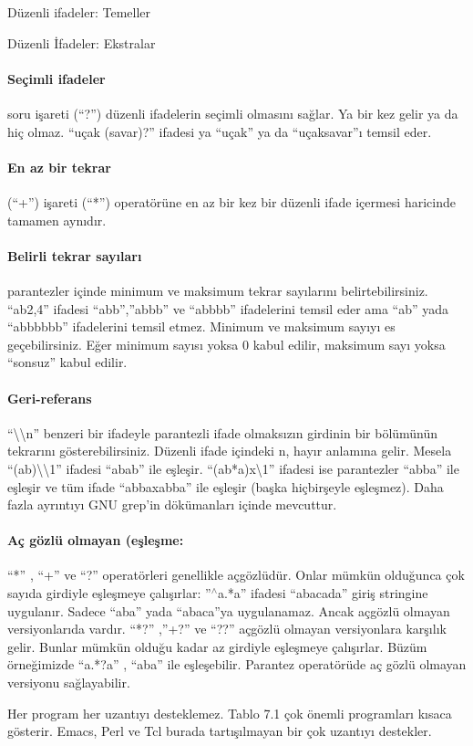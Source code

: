 \documentclass[10pt,a5paper]{book}
\begin{document}
\begin{section}{Düzenli ifadeler: Temeller}
\begin{subsection}{Düzenli İfadeler: Ekstralar}
\paragraph{Seçimli ifadeler} {soru işareti (“?”) düzenli ifadelerin seçimli olmasını sağlar. Ya bir kez gelir ya da hiç olmaz.	“uçak (savar)?” ifadesi ya “uçak” ya da “uçaksavar”ı temsil eder.}
\paragraph{En az bir tekrar}{  (“+”) işareti (“*”) operatörüne en az bir kez bir düzenli ifade içermesi haricinde tamamen aynıdır. }
\paragraph{Belirli tekrar sayıları}{ parantezler içinde minimum ve maksimum tekrar sayılarını belirtebilirsiniz. “ab{2,4}” ifadesi “abb”,”abbb” ve “abbbb” ifadelerini temsil eder ama “ab” yada “abbbbbb” ifadelerini temsil etmez. Minimum ve maksimum sayıyı es geçebilirsiniz. Eğer minimum sayısı yoksa 0 kabul edilir, maksimum sayı yoksa  “sonsuz” kabul edilir.}
\paragraph{Geri-referans}{ “\textbackslash \textbackslash n” benzeri bir ifadeyle parantezli ifade olmaksızın girdinin bir bölümünün tekrarını gösterebilirsiniz. Düzenli ifade içindeki n, hayır anlamına gelir. Mesela “(ab)\textbackslash \textbackslash 1” ifadesi “abab” ile eşleşir. “(ab*a)x\textbackslash 1” ifadesi ise parantezler “abba” ile eşleşir ve tüm ifade “abbaxabba” ile eşleşir (başka hiçbirşeyle eşleşmez). Daha fazla ayrıntıyı GNU grep’in dökümanları içinde mevcuttur.}
\paragraph{Aç gözlü olmayan (eşleşme:}{
 “*” , “+” ve “?” operatörleri genellikle açgözlüdür. Onlar mümkün olduğunca çok sayıda girdiyle eşleşmeye çalışırlar: ”$ ^\wedge $a.*a” ifadesi “abacada” giriş stringine uygulanır. Sadece “aba” yada “abaca”ya uygulanamaz. Ancak açgözlü olmayan versiyonlarıda vardır. “*?” ,”+?” ve “??” açgözlü olmayan versiyonlara karşılık gelir. Bunlar mümkün olduğu kadar az girdiyle eşleşmeye çalışırlar. Büzüm örneğimizde “a.*?a” , “aba” ile eşleşebilir. Parantez operatörüde aç gözlü olmayan versiyonu sağlayabilir.}
 
Her program her uzantıyı desteklemez. Tablo 7.1 çok önemli programları kısaca gösterir. Emacs, Perl ve Tcl burada tartışılmayan bir çok uzantıyı destekler.
\end{subsection}
\end{section}
\end{document}
